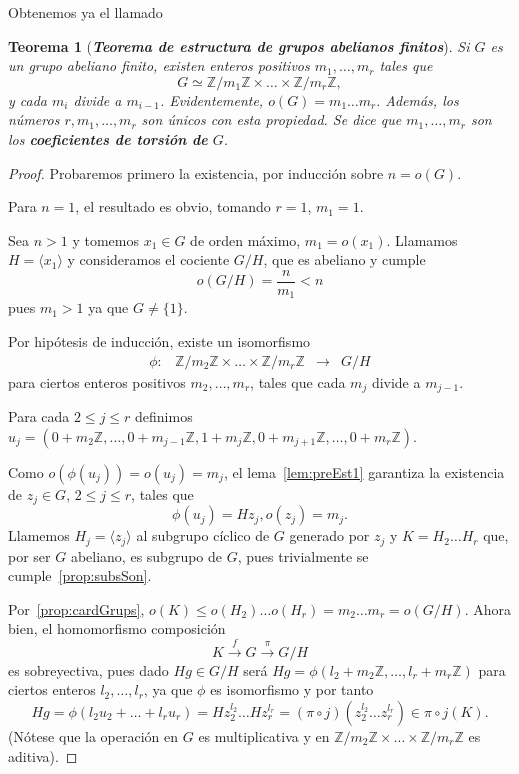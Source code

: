 \documentclass[12pt]{article}
\newtheorem{theorem}{Teorema}[section]
\begin{document}
Obtenemos ya el llamado

\begin{theorem}[\textbf{\textit{Teorema de estructura de grupos abelianos finitos}}] \label{the:teoEst}
Si $G$ es un grupo abeliano finito, existen enteros positivos $m_1, \ldots, m_r$ tales que $$G \simeq \mathbb{Z}/m_1\mathbb{Z} \times \ldots \times \mathbb{Z}/m_r \mathbb{Z},$$ y cada $m_i$ divide a $m_{i-1}$. Evidentemente, $o(G) = m_1 \ldots m_r.$ Además, los números $r, m_1, \ldots, m_r$ son únicos con esta propiedad. Se dice que $m_1, \ldots, m_r$ son los \textbf{coeficientes de torsión de} $G$.
\end{theorem}
\begin{proof}
Probaremos primero la existencia, por inducción sobre $n = o(G)$.

Para $n=1$, el resultado es obvio, tomando $r=1$, $m_1 = 1$. 

Sea $n>1$ y tomemos $x_1 \in G$ de orden máximo, $m_1 = o(x_1)$. Llamamos $H = \langle x_1 \rangle$ y consideramos el cociente $G/H$, que es abeliano y cumple $$o(G/H) = \dfrac{n}{m_1}<n$$ pues $m_1>1$ ya que $G \neq \lbrace 1 \rbrace.$

Por hipótesis de inducción, existe un isomorfismo $$\begin{array}{rccl}
\phi\colon &\mathbb{Z}/m_2\mathbb{Z} \times \ldots \times \mathbb{Z}/m_r\mathbb{Z}& \longrightarrow & G/H
\end{array}
$$ 
para ciertos enteros positivos $m_2, \ldots, m_r$, tales que cada $m_j$ divide a $m_{j-1}$.

Para cada $2 \leq j \leq r$ definimos $u_j =(0 + m_2 \mathbb{Z}, \ldots, 0 + m_{j-1}\mathbb{Z}, 1 + m_j\mathbb{Z}, 0 + m_{j+1}\mathbb{Z}, \ldots, 0 + m_r\mathbb{Z})$.

Como $o(\phi(u_j)) = o(u_j) = m_j$, el lema~\ref{lem:preEst1} garantiza la existencia de $z_j \in G$, $2 \leq j \leq r$, tales que $$\phi(u_j)=Hz_j, o(z_j) = m_j.$$
Llamemos $H_j = \langle z_j \rangle$ al subgrupo cíclico de $G$ generado por $z_j$ y $K = H_2 \ldots H_r$ que, por ser $G$ abeliano, es subgrupo de $G$, pues trivialmente se cumple~\ref{prop:subsSon}.

Por~\ref{prop:cardGrups}, $o(K) \leq o(H_2) \ldots o(H_r) = m_2 \ldots m_r = o(G/H)$. Ahora bien, el homomorfismo  composición $$K \stackrel{f}{\longrightarrow} G \stackrel{\pi}{\longrightarrow} G/H$$ es sobreyectiva, pues dado $Hg \in G/H$ será $Hg = \phi(l_2 + m_2\mathbb{Z}, \ldots, l_r + m_r \mathbb{Z})$ para ciertos enteros $l_2, \ldots, l_r$, ya que $\phi$ es isomorfismo y por tanto $$ Hg = \phi(l_2u_2 + \ldots + l_ru_r) = Hz_2^{l_2}\ldots Hz_r^{l_r} = (\pi \circ j)(z_2^{l_2}\ldots z_r^{l_r}) \in \pi \circ j(K).$$ (Nótese que la operación en $G$ es multiplicativa y en $\mathbb{Z}/m_2\mathbb{Z} \times \ldots \times \mathbb{Z}/m_r\mathbb{Z}$ es aditiva).


\end{proof}
\end{document}
